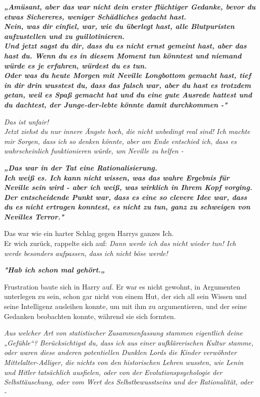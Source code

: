 {\textbf{\emph{„Amüsant, aber das war nicht dein erster flüchtiger Gedanke, bevor du etwas Sichereres, weniger Schädliches gedacht hast.\\ Nein, was dir einfiel, war, wie du überlegt hast, alle Blutpuristen aufzustellen und zu guillotinieren.}}\\ \textbf{\emph{\hfill\break Und jetzt sagst du dir, dass du es nicht ernst gemeint hast, aber das hast du. Wenn du es in diesem Moment tun könntest und niemand würde es je erfahren, würdest du es tun.}}\\ \textbf{\emph{\hfill\break Oder was du heute Morgen mit Neville Longbottom gemacht hast, tief in dir drin wusstest du, dass das falsch war, aber du hast es trotzdem getan, weil es Spaß gemacht hat und du eine gute Ausrede hattest und du dachtest, der Junge-der-lebte könnte damit durchkommen -"}}

\emph{Das ist unfair!\\ } \emph{Jetzt ziehst du nur innere Ängste hoch, die nicht unbedingt real sind! Ich machte mir Sorgen, dass ich so denken könnte, aber am Ende entschied ich, dass es wahrscheinlich funktionieren würde, um Neville zu helfen -}

\textbf{\emph{„Das war in der Tat eine Rationalisierung.\\ Ich weiß es. Ich kann nicht wissen, was das wahre Ergebnis für Neville sein wird - aber ich weiß, was wirklich in Ihrem Kopf vorging.\\ Der entscheidende Punkt war, dass es eine so clevere Idee war, dass du es nicht ertragen konntest, es nicht zu tun, ganz zu schweigen von Nevilles Terror."}}

Das war wie ein harter Schlag gegen Harrys ganzes Ich.\\ Er wich zurück, rappelte sich auf: \emph{Dann werde ich das nicht wieder tun! Ich werde besonders aufpassen, dass ich nicht böse werde!}

\textbf{\emph{"Hab ich schon mal gehört.„}}

Frustration baute sich in Harry auf. Er war es nicht gewohnt, in Argumenten unterlegen zu sein, schon gar nicht von einem Hut, der sich all sein Wissen und seine Intelligenz ausleihen konnte, um mit ihm zu argumentieren, und der seine Gedanken beobachten konnte, während sie sich formten.

\emph{Aus welcher Art von statistischer Zusammenfassung stammen eigentlich deine „Gefühle“? Berücksichtigst du, dass ich aus einer aufklärerischen Kultur stamme, oder waren diese anderen potentiellen Dunklen Lords die Kinder verwöhnter Mittelalter-Adliger, die nichts von den historischen Lehren wussten, wie Lenin und Hitler tatsächlich ausfielen, oder von der Evolutionspsychologie der Selbsttäuschung, oder vom Wert des Selbstbewusstseins und der Rationalität, oder -}

}
